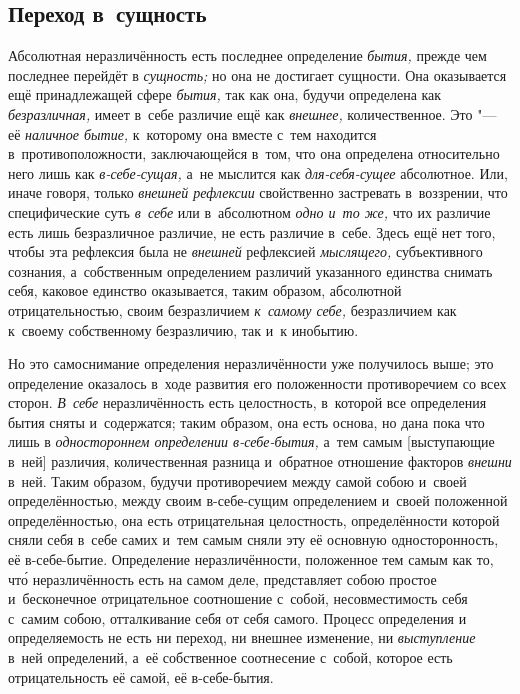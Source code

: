 \subsection[Переход в~сущность]{Переход в~сущность}

Абсолютная неразличённость есть последнее определение {\em бытия,} прежде чем
последнее перейдёт в {\em сущность;} но она не достигает сущности. Она
оказывается ещё принадлежащей сфере {\em бытия,} так как она, будучи определена
как {\em безразличная,} имеет в~себе различие ещё как {\em внешнее,}
количественное. Это "--- её {\em наличное бытие,} к~которому она вместе с~тем
находится в~противоположности, заключающейся в~том, что она определена
относительно него лишь как {\em в-себе-сущая,} а~не мыслится как
{\em для-себя-сущее} абсолютное. Или, иначе говоря, только
{\em внешней рефлексии} свойственно застревать в~воззрении, что специфические
суть {\em в~себе} или в~абсолютном {\em одно и~то же,} что их различие есть
лишь безразличное различие, не есть различие в~себе. Здесь ещё нет того, чтобы
эта рефлексия была не {\em внешней} рефлексией {\em мыслящего,} субъективного
сознания, а~собственным определением различий указанного единства снимать себя,
каковое единство оказывается, таким образом, абсолютной отрицательностью, своим
безразличием {\em к~самому себе,} безразличием как к~своему собственному
безразличию, так и~к инобытию.

Но это самоснимание определения неразличённости уже получилось выше; это
определение оказалось в~ходе развития его положенности противоречием со всех
сторон. {\em В~себе} неразличённость есть целостность, в~которой все
определения бытия сняты и~содержатся; таким образом, она есть основа, но дана
пока что лишь в {\em одностороннем определении в-себе-бытия,} а~тем самым
[выступающие в~ней] различия, количественная разница и~обратное отношение
факторов {\em внешни} в~ней. Таким образом, будучи противоречием между самой
собою и~своей определённостью, между своим в-себе-сущим определением и~своей
положенной определённостью, она есть отрицательная целостность, определённости
которой сняли себя в~себе самих и~тем самым сняли эту её основную
односторонность, её в-себе-бытие. Определение неразличённости, положенное тем
самым как то, чт\'{о} неразличённость есть на самом деле, представляет собою
простое и~бесконечное отрицательное соотношение с~собой, несовместимость себя
с~самим собою, отталкивание себя от себя самого. Процесс определения и
определяемость не есть ни переход, ни внешнее изменение, ни {\em выступление}
в~ней определений, а~её собственное соотнесение с~собой, которое есть
отрицательность её самой, её в-себе-бытия.

